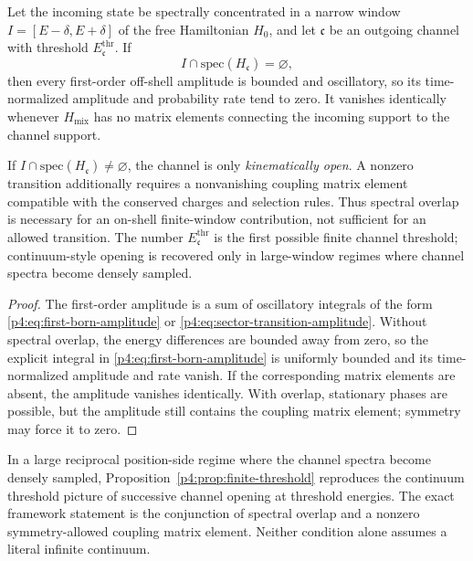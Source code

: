 \documentclass[12pt,a4paper]{article}
\begin{document}
\begin{proposition}
\label{p4:prop:finite-threshold}
Let the incoming state be spectrally concentrated in a narrow window
\(I=[E-\delta,E+\delta]\) of the free Hamiltonian \(H_0\), and let
\(\mathfrak c\) be an outgoing channel with threshold
\(E_{\mathfrak c}^{\mathrm{thr}}\).
If
\begin{equation}
\label{p4:eq:no-threshold-overlap}
I\cap \mathrm{spec}(H_{\mathfrak c})=\varnothing,
\end{equation}
then every first-order off-shell amplitude is bounded and oscillatory, so its
time-normalized amplitude and probability rate tend to zero.  It vanishes
identically whenever \(H_{\mathrm{mix}}\) has no matrix elements connecting
the incoming support to the channel support.

If \(I\cap\mathrm{spec}(H_{\mathfrak c})\ne\varnothing\), the channel is
only \emph{kinematically open}.  A nonzero transition additionally requires
a nonvanishing coupling matrix element compatible with the conserved charges
and selection rules.  Thus spectral overlap is necessary for an on-shell
finite-window contribution, not sufficient for an allowed transition.  The
number \(E_{\mathfrak c}^{\mathrm{thr}}\) is the first possible finite
channel threshold; continuum-style opening is recovered only in large-window
regimes where channel spectra become densely sampled.
\end{proposition}

\begin{proof}
The first-order amplitude is a sum of oscillatory integrals of the form
\eqref{p4:eq:first-born-amplitude} or \eqref{p4:eq:sector-transition-amplitude}.
Without spectral overlap, the energy differences are bounded away from zero,
so the explicit integral in
\eqref{p4:eq:first-born-amplitude} is uniformly bounded and its
time-normalized amplitude and rate vanish.  If the corresponding matrix
elements are absent, the amplitude vanishes identically.  With overlap,
stationary phases are possible, but the amplitude still contains the
coupling matrix element; symmetry may force it to zero.
\end{proof}

\begin{remark}
\label{p4:rem:effective-threshold-language}
In a large reciprocal position-side regime where the channel spectra become densely sampled,
Proposition~\ref{p4:prop:finite-threshold} reproduces the continuum threshold picture of
successive channel opening at threshold energies.
The exact framework statement is the conjunction of spectral overlap and a
nonzero symmetry-allowed coupling matrix element.  Neither condition alone
assumes a literal infinite continuum.
\end{remark}
\end{document}
